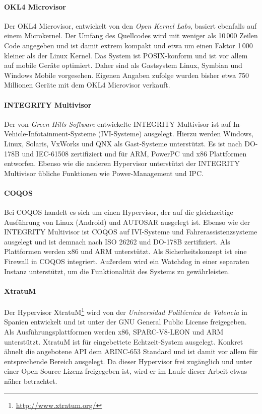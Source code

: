 \documentclass[
  a4paper,					    %
  twoside,
  DIV=calc,     				%
  bibliography=totoc,
  cleardoublepage=empty,
  ngerman,     					%
  final       					%
]{scrbook}
\begin{document}
\paragraph{OKL4 Microvisor}
Der OKL4 Microvisor, entwickelt von den \emph{Open Kernel Labs}, basiert ebenfalls auf einem Microkernel. Der Umfang des Quellcodes wird mit weniger als 10\,000 Zeilen Code angegeben und ist damit extrem kompakt und etwa um einen Faktor 1\,000 kleiner als der Linux Kernel.\cite{wiki:loc} Das System ist POSIX-konform und ist vor allem auf mobile Geräte optimiert. Daher sind als Gastsystem Linux, Symbian und Windows Mobile vorgesehen. Eigenen Angaben zufolge wurden bisher etwa 750 Millionen Geräte mit dem OKL4 Microvisor verkauft.\cite{okl4}

\paragraph{INTEGRITY Multivisor}
Der von \emph{Green Hills Software} entwickelte INTEGRITY Multivisor ist auf In-Vehicle-Infotainment-Systeme (IVI-Systeme) ausgelegt. Hierzu werden Windows, Linux, Solaris, VxWorks und QNX als Gast-Systeme unterstützt. Es ist nach DO-178B und IEC-61508 zertifiziert und für ARM, PowerPC und x86 Plattformen entworfen. Ebenso wie die anderen Hypervisor unterstützt der INTEGRITY Multivisor übliche Funktionen wie Power-Management und IPC.

\paragraph{COQOS}
Bei COQOS handelt es sich um einen Hypervisor, der auf die gleichzeitige Ausführung von Linux (Android) und AUTOSAR ausgelegt ist. Ebenso wie der INTEGRITY Multivisor ist COQOS auf IVI-Systeme und Fahrerassistenzsysteme ausgelegt und ist demnach nach ISO 26262 und DO-178B zertifiziert. Als Plattformen werden x86 und ARM unterstützt. Als Sicherheitskonzept ist eine Firewall in COQOS integriert. Außerdem wird ein Watchdog in einer separaten Instanz unterstützt, um die Funktionalität des Systems zu gewährleisten.

\paragraph{XtratuM}
Der Hypervisor XtratuM\footnote{\url{http://www.xtratum.org/}} wird von der \emph{Universidad Politécnica de Valencia} in Spanien entwickelt und ist unter der GNU General Public License freigegeben. Als Ausführungsplattformen werden x86, SPARC-V8-LEON und ARM unterstützt. XtratuM ist für eingebettete Echtzeit-System ausgelegt. Konkret ähnelt die angebotene API dem ARINC-653 Standard und ist damit vor allem für entsprechende Bereich ausgelegt. Da dieser Hypervisor frei zugänglich und unter einer Open-Source-Lizenz freigegeben ist, wird er im Laufe dieser Arbeit etwas näher betrachtet.
\end{document}
